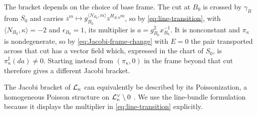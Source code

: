 The bracket depends on the choice of base frame.  The cut at $B_0$ is
crossed by $\gamma_B$ from $S_0$ and carries
$z^m\mapsto g_{B_0}^{\langle N_{B_0},m\rangle}z^{H_{B,0}m}$, so by
\eqref{eq:line-transition}, with $\langle N_{B_0},\kappa\rangle=-2$ and
$\epsilon_{B_0}=1$, its multiplier is $a=g_{B_0}^2x_{B_0}^{-1}$.  It is
nonconstant and $\pi_\kappa$ is nondegenerate, so by
\eqref{eq:Jacobi-frame-change} with $E=0$ the pair transported across that
cut has a vector field which, expressed in the chart of $S_0$, is
$\pi_\kappa^\sharp(da)\neq0$.  Starting instead from $(\pi_\kappa,0)$ in the
frame beyond that cut therefore gives a different Jacobi bracket.

The Jacobi bracket of $\mathcal L_\kappa$ can equivalently be described by its
Poissonization, a homogeneous Poisson structure on
$\mathcal L_\kappa^\vee\setminus0$ \cite{vitaglianowade2016}.  We use the
line-bundle formulation because it displays the multiplier in
\eqref{eq:line-transition} explicitly.

